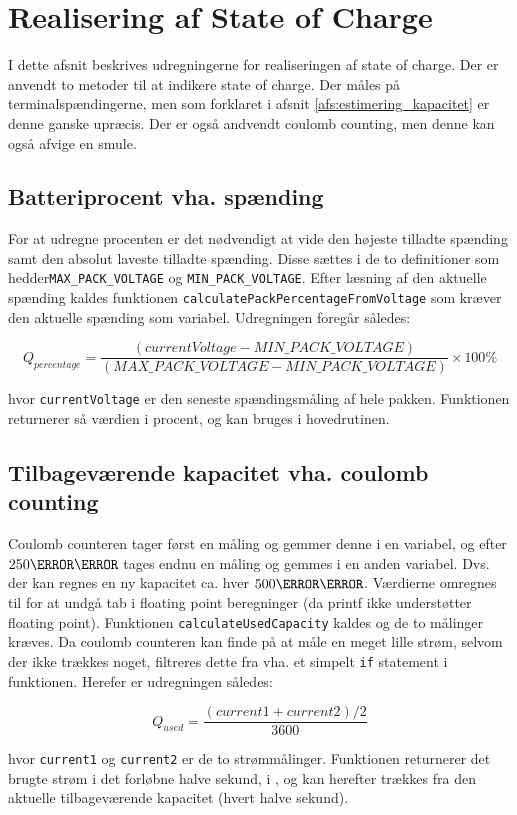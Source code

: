 \section{Realisering af State of Charge}
I dette afsnit beskrives udregningerne for realiseringen af state of charge. Der er anvendt to metoder til at indikere state of charge. Der måles på terminalspændingerne, men som forklaret i afsnit \ref{afs:estimering_kapacitet} er denne ganske upræcis. Der er også andvendt coulomb counting, men denne kan også afvige en smule.

\subsection{Batteriprocent vha. spænding}
For at udregne procenten er det nødvendigt at vide den højeste tilladte spænding samt den absolut laveste tilladte spænding. Disse sættes i de to definitioner som hedder\newline \verb|MAX_PACK_VOLTAGE| og \verb|MIN_PACK_VOLTAGE|. Efter læsning af den aktuelle spænding kaldes funktionen \verb|calculatePackPercentageFromVoltage| som kræver den aktuelle spænding som variabel. Udregningen foregår således:

\begin {equation}
Q_{percentage} =  \frac{(\mathit{currentVoltage} - \mathit{MIN\_PACK\_VOLTAGE})}{(\mathit{MAX\_PACK\_VOLTAGE} - \mathit{MIN\_PACK\_VOLTAGE})} \times 100\percent
\label{eq:q_percentage}
\end {equation}

hvor \verb|currentVoltage| er den seneste spændingsmåling af hele pakken. Funktionen returnerer så værdien i procent, og kan bruges i hovedrutinen.

\subsection{Tilbageværende kapacitet vha. coulomb counting}
Coulomb counteren tager først en måling og gemmer denne i en variabel, og efter $250\milli\second$ tages endnu en måling og gemmes i en anden variabel. Dvs. der kan regnes en ny kapacitet ca. hver $500\milli\second$. Værdierne omregnes til \micro\ampere\space for at undgå tab i floating point beregninger (da printf ikke understøtter floating point). Funktionen \verb|calculateUsedCapacity| kaldes og de to målinger kræves. Da coulomb counteren kan finde på at måle en meget lille strøm, selvom der ikke trækkes noget, filtreres dette fra vha. et simpelt \verb|if| statement i funktionen. Herefer er udregningen således: 

\begin {equation}
Q_{used} =  \frac{(\mathit{current1} + \mathit{current2}) / 2}{3600}
\label{eq:q_used}
\end {equation}

hvor \verb|current1| og \verb|current2| er de to strømmålinger. Funktionen returnerer det brugte strøm i det forløbne halve sekund, i \micro\ampere, og kan herefter trækkes fra den aktuelle tilbageværende kapacitet (hvert halve sekund). 